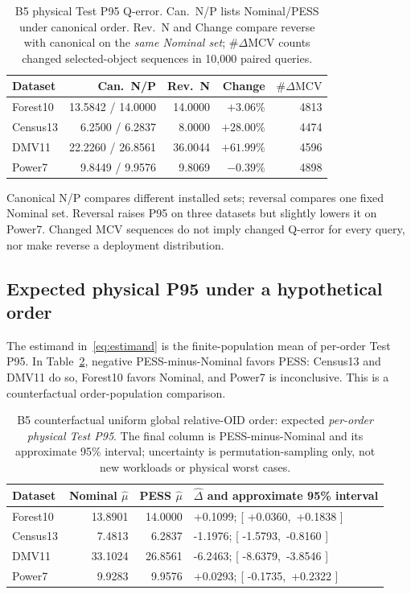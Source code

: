 \documentclass[sigconf, nonacm]{acmart}
\begin{document}
\begin{table}[!tbp]
\caption{B5 physical Test P95 Q-error. Can.\ N/P
lists Nominal/PESS under canonical order. Rev.\ N and
Change compare reverse with canonical on the
\emph{same Nominal set}; \(\#\Delta\mathrm{MCV}\) counts
changed selected-object sequences in 10,000 paired queries.}
\label{tab:physical}
\centering\scriptsize
\begin{tabular}{@{}lrrrr@{}}
\toprule
Dataset & Can.\ N/P & Rev.\ N &
Change & \(\#\Delta\mathrm{MCV}\)\\
\midrule
Forest10 & 13.5842 / 14.0000 & 14.0000 & \(+3.06\%\) & 4813\\
Census13 & 6.2500 / 6.2837 & 8.0000 & \(+28.00\%\) & 4474\\
DMV11 & 22.2260 / 26.8561 & 36.0044 & \(+61.99\%\) & 4596\\
Power7 & 9.8449 / 9.9576 & 9.8069 & \(-0.39\%\) & 4898\\
\bottomrule
\end{tabular}
\end{table}

Canonical N/P compares different installed sets; reversal compares
one fixed Nominal set. Reversal raises P95 on three datasets but
slightly lowers it on Power7. Changed MCV sequences do not imply
changed Q-error for every query, nor make reverse a deployment
distribution.

\subsection{Expected physical P95 under a hypothetical order}
The estimand in~\eqref{eq:estimand} is the finite-population mean
of per-order Test P95. In Table~\ref{tab:expected}, negative
PESS-minus-Nominal favors PESS: Census13 and DMV11 do so, Forest10
favors Nominal, and Power7 is inconclusive. This is a counterfactual
order-population comparison.

\begin{table}[!tbp]
\caption{B5 counterfactual uniform global relative-OID
order: expected \emph{per-order physical Test P95}.
The final column is PESS-minus-Nominal and its approximate
95\% interval; uncertainty is permutation-sampling only,
not new workloads or physical worst cases.}
\label{tab:expected}
\centering\scriptsize
\begin{tabular}{@{}lrrp{}@{}}
\toprule
Dataset & Nominal \(\widehat\mu\) &
PESS \(\widehat\mu\) & \(\widehat\Delta\) and approximate 95\% interval\\
\midrule
Forest10 & 13.8901 & 14.0000 & +0.1099; [ +0.0360,\ +0.1838 ]\\
Census13 & 7.4813 & 6.2837 & -1.1976; [ -1.5793,\ -0.8160 ]\\
DMV11 & 33.1024 & 26.8561 & -6.2463; [ -8.6379,\ -3.8546 ]\\
Power7 & 9.9283 & 9.9576 & +0.0293; [ -0.1735,\ +0.2322 ]\\
\bottomrule
\end{tabular}
\end{table}
\end{document}

